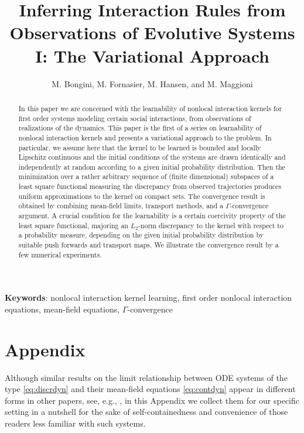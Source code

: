 \documentclass[A4paper,11pt]{article}
\title{Inferring Interaction Rules from Observations of Evolutive Systems I: The Variational Approach}
\author{M. Bongini, M. Fornasier, M. Hansen, and M. Maggioni}
\date{}
\theoremstyle{definition}
\begin{document}
\maketitle

\begin{abstract}
In this paper we are concerned with the  learnability of nonlocal interaction kernels for  first order systems modeling certain social interactions, from observations of realizations of the dynamics. This paper is the first  of a series  on learnability of nonlocal interaction kernels and presents a variational approach to the problem. In particular, we assume here that the kernel to be learned is bounded and locally Lipschitz continuous and the initial conditions of the systems are drawn identically and independently at random according to a given initial probability distribution. Then the minimization over a rather arbitrary  sequence of (finite dimensional) subspaces of a least square functional measuring the discrepancy from observed trajectories  produces uniform approximations to the kernel on compact sets. The convergence result is obtained by combining mean-field limits, transport methods, and a $\Gamma$-convergence argument. A crucial condition for the learnability is a certain coercivity property of the least square functional, majoring an $L_2$-norm discrepancy to the kernel with respect to a probability measure, depending on the given initial probability distribution by suitable push forwards and transport maps. We illustrate the convergence result by a few numerical experiments. 
\end{abstract}
{\bf Keywords}: nonlocal interaction kernel learning, first order nonlocal interaction equations, mean-field equations, $\Gamma$-convergence

\bigskip

\tableofcontents













\section{Appendix}

 Although  similar results on the limit relationship between ODE systems of the type \eqref{eq:discrdyn} and their mean-field equations \eqref{eq:contdyn}
appear in different forms in other papers, see, e.g., \cite{AGS,CanCarRos10,13-Carrillo-Choi-Hauray-MFL,MFOC}, in this Appendix we collect them for our specific setting in a nutshell for the sake of self-containedness and convenience of those readers less familiar with such systems.
\end{document}
